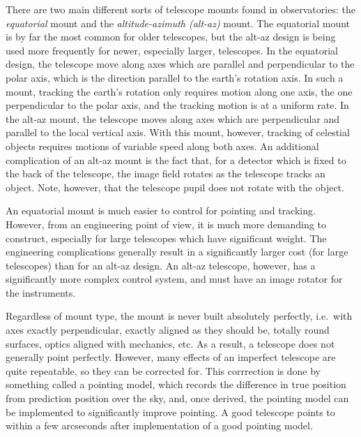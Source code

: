 \documentclass[12pt]{article}
\begin{document}
There are two main different sorts of telescope mounts found in observatories:
the \textit{equatorial} mount and the \textit{altitude-azimuth (alt-az)} mount.
The equatorial mount is by far the most common for older telescopes, but the
alt-az design is being used more frequently for newer, especially larger,
telescopes. In the equatorial design, the telescope move along axes which are
parallel and perpendicular to the polar axis, which is the direction parallel
to the earth's rotation axis. In such a mount, tracking the earth's rotation
only requires motion along one axis, the one perpendicular to the polar axis,
and the tracking motion is at a uniform rate. In the alt-az mount, the
telescope moves along axes which are perpendicular and parallel to the local
vertical axis. With this mount, however, tracking of celestial objects requires
motions of variable speed along both axes. An additional complication of an
alt-az mount is the fact that, for a detector which is fixed to the back of the
telescope, the image field rotates as the telescope tracks an object. Note,
however, that the telescope pupil does not rotate with the object.

An equatorial mount is much easier to control for pointing and tracking.
However, from an engineering point of view, it is much more demanding to
construct, especially for large telescopes which have significant weight. The
engineering complications generally result in a significantly larger cost (for
large telescopes) than for an alt-az design. An alt-az telescope, however, has
a significantly more complex control system, and must have an image rotator for
the instruments.

Regardless of mount type, the mount is never built absolutely perfectly, i.e.\
with axes exactly perpendicular, exactly aligned as they should be, totally
round surfaces, optics aligned with mechanics, etc. As a result, a telescope
does not generally point perfectly. However, many effects of an imperfect
telescope are quite repeatable, so they can be corrected for. This corrrection
is done by something called a pointing model, which records the difference in
true position from prediction position over the sky, and, once derived, the
pointing model can be implemented to significantly improve pointing. A good
telescope points to within a few arcseconds after implementation of a good
pointing model.
\end{document}
